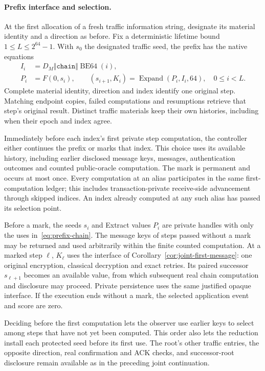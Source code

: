 \documentclass[pdflatex]{sn-jnl}
\theoremstyle{thmstyleone}
\theoremstyle{thmstylethree}
\theoremstyle{thmstyletwo}
\begin{document}
\paragraph{Prefix interface and selection.}
At the first allocation of a fresh traffic information string, designate
its material identity and a direction as before. Fix a deterministic
lifetime bound $1\le L\le 2^{64}-1$. With $s_0$ the designated traffic
seed, the prefix has the native equations
\begin{equation}
\begin{split}
 I_i&=D_M\Vert\texttt{chain}\Vert\operatorname{BE64}(i),\\
 P_i&=F(0,s_i),\qquad
 (s_{i+1},K_i)=\operatorname{Expand}(P_i,I_i,64),
 \quad 0\le i<L.
\end{split}
\label{eq:prefix-chain}
\end{equation}
Complete material identity, direction and index identify one original
step. Matching endpoint copies, failed computations and resumptions
retrieve that step's original result. Distinct traffic materials keep
their own histories, including when their epoch and index agree.

Immediately before each index's first private step computation, the
controller either continues the prefix or marks that index. This choice
uses its available history, including earlier disclosed message keys,
messages, authentication outcomes and counted public-oracle computation.
The mark is permanent and occurs at most once. Every computation at an
alias participates in the same first-computation ledger; this includes
transaction-private receive-side advancement through skipped indices.
An index already computed at any such alias has passed its selection point.

Before a mark, the seeds $s_i$ and Extract values $P_i$ are private
handles with only the uses in~\eqref{eq:prefix-chain}. The message keys
of steps passed without a mark may be returned and used arbitrarily
within the finite counted computation. At a marked step $\ell$, $K_\ell$
uses the interface of Corollary~\ref{cor:joint-first-message}: one original
encryption, classical decryption and exact retries. Its paired successor
$s_{\ell+1}$ becomes an available value, from which subsequent real chain
computation and disclosure may proceed. Private persistence uses the
same justified opaque interface. If the execution ends without a mark,
the selected application event and score are zero.

Deciding before the first computation lets the observer use earlier keys
to select among steps that have not yet been computed. This order also
lets the reduction install each protected seed before its first use. The
root's other traffic entries, the opposite direction, real confirmation and ACK checks,
and successor-root disclosure remain available as in the preceding joint
continuation.
\end{document}
